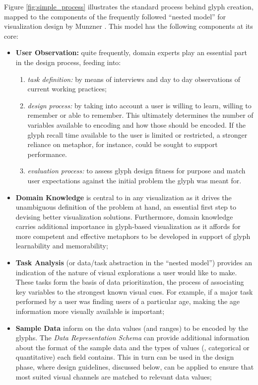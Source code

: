 Figure \ref{fig:simple_process} illustrates the standard process behind  glyph creation, mapped to the components of the frequently followed ``nested model'' for visualization design by Munzner \cite{munzner2009nested}.
This model has the following components at its core:

\begin{itemize}
\item \textbf{User Observation:} quite frequently, domain experts play an essential part in the design process, feeding into:
\begin{enumerate}
	\item \emph{task definition:} by means of interviews and day to day observations of current working practices;
	\item \emph{design process:} by taking into account a user is willing to learn, willing to remember or able to remember. This ultimately determines the number of variables available to encoding and how those should be encoded. If the glyph recall time available to the user is limited or restricted, a stronger reliance on metaphor, for instance, could be sought to support performance.
	\item \emph{evaluation process:} to assess glyph design fitness for purpose and match user expectations against the initial problem the glyph was meant for.
\end{enumerate}
\item \textbf{Domain Knowledge} is central to in any visualization as it drives the unambiguous definition of the problem at hand, an essential first step to devising  better visualization solutions.
Furthermore, domain knowledge carries additional importance in glyph-based visualization  as it affords for more competent and effective metaphors to be developed in support of glyph learnability and memorability;

\item \textbf{Task Analysis} (or data/task abstraction in the ``nested model'') provides an indication of the nature of visual explorations a user would like to make.
These tasks form the basis of data prioritization, the process of associating key variables to the strongest known visual cues. For example, if a major task performed by a user was finding users of a particular age, making the age information more visually available is important;

\item \textbf{Sample Data} inform on the data values (and ranges) to be encoded by the glyphs.
The \emph{Data Representation Schema} can provide additional information about the format of the sample data and the types of values  (\eg, categorical or quantitative) each field contains.
This in turn can be used in the design phase, where design guidelines, discussed below, can be applied to ensure that most suited visual channels are matched to relevant data values;


\end{itemize}
